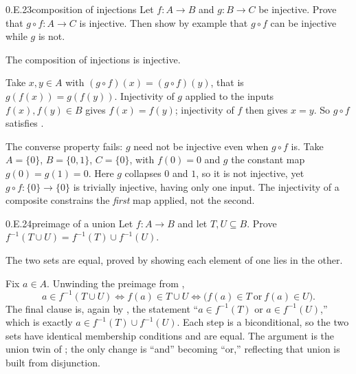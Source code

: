 \documentclass[main.tex]{subfiles}
\begin{document}
\begin{Exercise}{0.E.23}{composition of injections}
Let $f\colon A\to B$ and $g\colon B\to C$ be injective. Prove that $g\circ f\colon A\to C$ is
injective. Then show by example that $g\circ f$ can be injective while $g$ is not.
\end{Exercise}
\begin{Solution}
The composition of injections is injective.

Take $x,y\in A$ with $(g\circ f)(x)=(g\circ f)(y)$, that is $g(f(x))=g(f(y))$. Injectivity of $g$
applied to the inputs $f(x),f(y)\in B$ gives $f(x)=f(y)$; injectivity of $f$ then gives $x=y$. So
$g\circ f$ satisfies .

The converse property fails: $g$ need not be injective even when $g\circ f$ is. Take $A=\{0\}$,
$B=\{0,1\}$, $C=\{0\}$, with $f(0)=0$ and $g$ the constant map $g(0)=g(1)=0$. Here $g$ collapses $0$
and $1$, so it is not injective, yet $g\circ f\colon\{0\}\to\{0\}$ is trivially injective, having only
one input. The injectivity of a composite constrains the \emph{first} map applied, not the second.
\end{Solution}

\begin{Exercise}{0.E.24}{preimage of a union}
Let $f\colon A\to B$ and let $T,U\subseteq B$. Prove $f^{-1}(T\cup U)=f^{-1}(T)\cup f^{-1}(U)$.
\end{Exercise}
\begin{Solution}
The two sets are equal, proved by showing each element of one lies in the other.

Fix $a\in A$. Unwinding the preimage from ,
\[
a\in f^{-1}(T\cup U)
\iff f(a)\in T\cup U
\iff \bigl(f(a)\in T\ \text{or}\ f(a)\in U\bigr).
\]
The final clause is, again by , the statement ``$a\in f^{-1}(T)$ or $a\in f^{-1}(U)$,''
which is exactly $a\in f^{-1}(T)\cup f^{-1}(U)$. Each step is a biconditional, so the two sets have
identical membership conditions and are equal. The argument is the union twin of ; the only
change is ``and'' becoming ``or,'' reflecting that union is built from disjunction.
\end{Solution}
\end{document}
